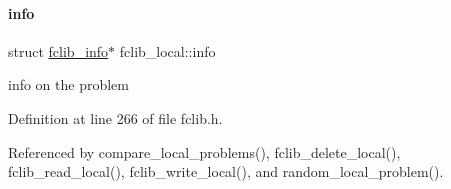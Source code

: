 \mbox{\label{structfclib__local_ababce9da71cdb99e4928a596dde8bc89}} 
\paragraph{\texorpdfstring{info}{info}}
{\footnotesize\ttfamily struct \mbox{\hyperlink{structfclib__info}{fclib\+\_\+info}}$\ast$ fclib\+\_\+local\+::info}



info on the problem 



Definition at line 266 of file fclib.\+h.



Referenced by compare\+\_\+local\+\_\+problems(), fclib\+\_\+delete\+\_\+local(), fclib\+\_\+read\+\_\+local(), fclib\+\_\+write\+\_\+local(), and random\+\_\+local\+\_\+problem().

